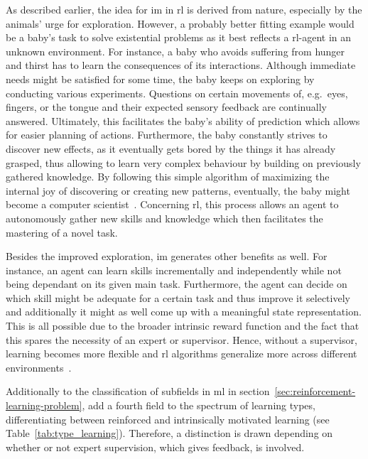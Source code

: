 \documentclass[draft,final]{vutinfth} %
\begin{document}
    As described earlier, the idea for \gls{im} in \gls{rl} is derived from nature, especially by the animals' urge for exploration.
    However, a probably better fitting example would be a baby's task to solve existential problems as it best reflects a \gls{rl}-agent in an unknown environment.
    For instance, a baby who avoids suffering from hunger and thirst has to learn the consequences of its interactions.
    Although immediate needs might be satisfied for some time, the baby keeps on exploring by conducting various experiments.
    Questions on certain movements of, e.g.\ eyes, fingers, or the tongue and their expected sensory feedback are continually answered.
    Ultimately, this facilitates the baby's ability of prediction which allows for easier planning of actions.
    Furthermore, the baby constantly strives to discover new effects, as it eventually gets bored by the things it has already grasped, thus allowing to learn very complex behaviour by building on previously gathered knowledge.
    By following this simple algorithm of maximizing the internal joy of discovering or creating new patterns, eventually, the baby might become a computer scientist~\citep{schmidhuber_formal_2010}.
    Concerning \gls{rl}, this process allows an agent to autonomously gather new skills and knowledge which then facilitates the mastering of a novel task.

    Besides the improved exploration, \gls{im} generates other benefits as well.
    For instance, an agent can learn skills incrementally and independently while not being dependant on its given main task.
    Furthermore, the agent can decide on which skill might be adequate for a certain task and thus improve it selectively and additionally it might as well come up with a meaningful state representation.
    This is all possible due to the broader intrinsic reward function and the fact that this spares the necessity of an expert or supervisor.
    Hence, without a supervisor, learning becomes more flexible and \gls{rl} algorithms generalize more across different environments~\citep{aubret_survey_2019}.

    Additionally to the classification of subfields in \gls{ml} in section~\ref{sec:reinforcement-learning-problem}, \citeauthor{aubret_survey_2019} add a fourth field to the spectrum of learning types, differentiating between reinforced and intrinsically motivated learning (see Table~\ref{tab:type_learning}).
    Therefore, a distinction is drawn depending on whether or not expert supervision, which gives feedback, is involved.
\end{document}
